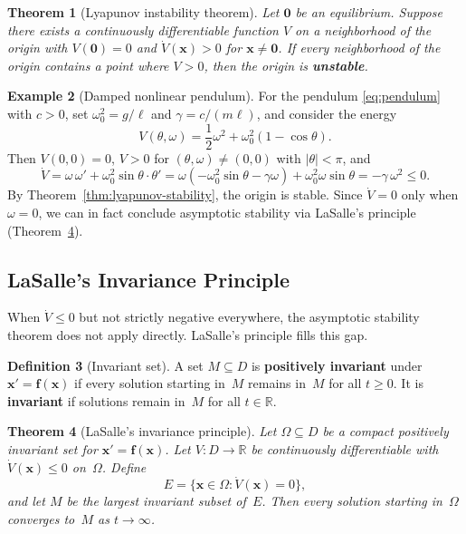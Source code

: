 \documentclass[12pt,a4paper,openany]{book}
\theoremstyle{definition}
\newtheorem{definition}{Definition}[chapter]
\newtheorem{example}[definition]{Example}
\theoremstyle{plain}
\newtheorem{theorem}[definition]{Theorem}
\theoremstyle{remark}
\newcommand{\R}{\mathbb{R}}
\newcommand{\abs}[1]{\left|#1\right|}
\begin{document}
\begin{theorem}[Lyapunov instability theorem]
\label{thm:lyapunov-instability}
Let \(\mathbf{0}\) be an equilibrium. Suppose there exists a continuously
differentiable function \(V\) on a neighborhood of the origin with
\(V(\mathbf{0})=0\) and \(\dot{V}(\mathbf{x})>0\) for \(\mathbf{x}\neq\mathbf{0}\).
If every neighborhood of the origin contains a point where \(V>0\), then the
origin is \textbf{unstable}.
\end{theorem}

\begin{example}[Damped nonlinear pendulum]
\label{ex:pendulum-lyapunov}
For the pendulum \eqref{eq:pendulum} with \(c>0\), set
\(\omega_0^2=g/\ell\) and \(\gamma=c/(m\ell)\), and consider the energy
\begin{equation}\label{eq:pendulum-energy}
  V(\theta,\omega) = \frac{1}{2}\omega^2 + \omega_0^2(1-\cos\theta).
\end{equation}
Then \(V(0,0)=0\), \(V>0\) for \((\theta,\omega)\neq(0,0)\) with
\(\abs{\theta}<\pi\), and
\[
  \dot{V} = \omega\,\omega' + \omega_0^2\sin\theta\cdot\theta'
  = \omega(-\omega_0^2\sin\theta-\gamma\omega)+\omega_0^2\omega\sin\theta
  = -\gamma\,\omega^2 \le 0.
\]
By Theorem~\ref{thm:lyapunov-stability}, the origin is stable. Since
\(\dot{V}=0\) only when \(\omega=0\), we can in fact conclude asymptotic
stability via LaSalle's principle (Theorem~\ref{thm:lasalle}).
\end{example}

\subsection{LaSalle's Invariance Principle}
\label{subsec:lasalle}

When \(\dot{V}\le 0\) but not strictly negative everywhere, the asymptotic
stability theorem does not apply directly. LaSalle's principle fills this gap.

\begin{definition}[Invariant set]
\label{def:invariant-set}
A set \(M\subseteq D\) is \textbf{positively invariant} under
\(\mathbf{x}'=\mathbf{f}(\mathbf{x})\) if every solution starting in~\(M\)
remains in~\(M\) for all \(t\ge 0\). It is \textbf{invariant} if solutions
remain in~\(M\) for all \(t\in\R\).
\end{definition}

\begin{theorem}[LaSalle's invariance principle]
\label{thm:lasalle}
Let \(\Omega\subseteq D\) be a compact positively invariant set for
\(\mathbf{x}'=\mathbf{f}(\mathbf{x})\). Let \(V\colon D\to\R\) be
continuously differentiable with \(\dot{V}(\mathbf{x})\le 0\) on~\(\Omega\).
Define
\[
  E = \{\mathbf{x}\in\Omega : \dot{V}(\mathbf{x})=0\},
\]
and let \(M\) be the largest invariant subset of~\(E\). Then every solution
starting in~\(\Omega\) converges to~\(M\) as \(t\to\infty\).
\end{theorem}
\end{document}
